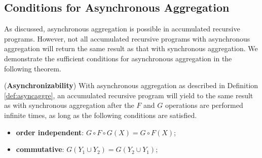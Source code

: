 {%


\subsection{Conditions for Asynchronous Aggregation}
\label{sec:async:condition}

As discussed, asynchronous aggregation is possible in accumulated recursive programs. However, not all accumulated recursive programs with asynchronous aggregation will return the same result as that with synchronous aggregation. We demonstrate the sufficient conditions for asynchronous aggregation in the following theorem.

\begin{theorem}
	\label{th:async}
	(\textbf{Asynchronizability}) With asynchronous aggregation as described in Definition \ref{def:asyncaggre}, an accumulated recursive program will yield to the same result as with synchronous aggregation after the $F$ and $G$ operations are performed infinite times, as long as the following conditions are satisfied.
	\begin{itemize}
		\item \textbf{order independent}: $G\circ F\circ G(X)=G\circ F(X)$;
		\item \textbf{commutative}: $G(Y_1\cup Y_2)=G(Y_2\cup Y_1)$;
	\end{itemize}
\end{theorem}

}
